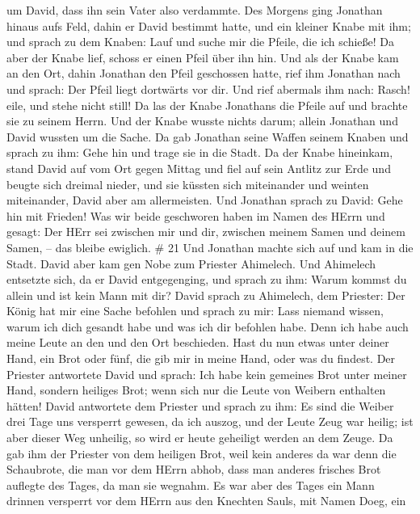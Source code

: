 um David, dass ihn sein Vater also verdammte.  Des Morgens
ging Jonathan hinaus aufs Feld, dahin er David bestimmt hatte, und ein
kleiner Knabe mit ihm;  und sprach zu dem Knaben: Lauf und
suche mir die Pfeile, die ich schieße! Da aber der Knabe lief, schoss er
einen Pfeil über ihn hin.  Und als der Knabe kam an den
Ort, dahin Jonathan den Pfeil geschossen hatte, rief ihm Jonathan nach
und sprach: Der Pfeil liegt dortwärts vor dir.  Und rief
abermals ihm nach: Rasch! eile, und stehe nicht still! Da las der Knabe
Jonathans die Pfeile auf und brachte sie zu seinem Herrn. 
Und der Knabe wusste nichts darum; allein Jonathan und David wussten um
die Sache.  Da gab Jonathan seine Waffen seinem Knaben und
sprach zu ihm: Gehe hin und trage sie in die Stadt.  Da der
Knabe hineinkam, stand David auf vom Ort gegen Mittag und fiel auf sein
Antlitz zur Erde und beugte sich dreimal nieder, und sie küssten sich
miteinander und weinten miteinander, David aber am allermeisten.
 Und Jonathan sprach zu David: Gehe hin mit Frieden! Was
wir beide geschworen haben im Namen des HErrn und gesagt: Der HErr sei
zwischen mir und dir, zwischen meinem Samen und deinem Samen, -- das
bleibe ewiglich. \# 21  Und Jonathan machte sich auf und kam
in die Stadt.  David aber kam gen Nobe zum Priester
Ahimelech. Und Ahimelech entsetzte sich, da er David entgegenging, und
sprach zu ihm: Warum kommst du allein und ist kein Mann mit dir?
 David sprach zu Ahimelech, dem Priester: Der König hat mir
eine Sache befohlen und sprach zu mir: Lass niemand wissen, warum ich
dich gesandt habe und was ich dir befohlen habe. Denn ich habe auch
meine Leute an den und den Ort beschieden.  Hast du nun
etwas unter deiner Hand, ein Brot oder fünf, die gib mir in meine Hand,
oder was du findest.  Der Priester antwortete David und
sprach: Ich habe kein gemeines Brot unter meiner Hand, sondern heiliges
Brot; wenn sich nur die Leute von Weibern enthalten hätten! 
David antwortete dem Priester und sprach zu ihm: Es sind die Weiber drei
Tage uns versperrt gewesen, da ich auszog, und der Leute Zeug war
heilig; ist aber dieser Weg unheilig, so wird er heute geheiligt werden
an dem Zeuge.  Da gab ihm der Priester von dem heiligen
Brot, weil kein anderes da war denn die Schaubrote, die man vor dem
HErrn abhob, dass man anderes frisches Brot auflegte des Tages, da man
sie wegnahm.  Es war aber des Tages ein Mann drinnen
versperrt vor dem HErrn aus den Knechten Sauls, mit Namen Doeg, ein
